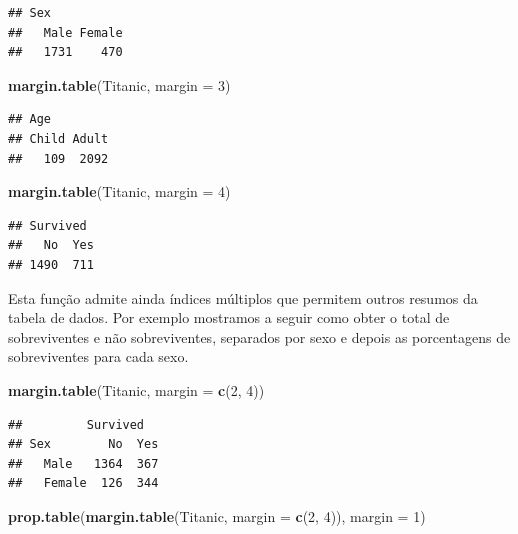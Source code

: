 \documentclass[
]{book}
\newenvironment{Shaded}{\begin{snugshade}}{\end{snugshade}}
\newcommand{\DataTypeTok}[1]{\textcolor[rgb]{0.13,0.29,0.53}{#1}}
\newcommand{\DecValTok}[1]{\textcolor[rgb]{0.00,0.00,0.81}{#1}}
\newcommand{\KeywordTok}[1]{\textcolor[rgb]{0.13,0.29,0.53}{\textbf{#1}}}
\newcommand{\NormalTok}[1]{#1}
\begin{document}
\begin{verbatim}
## Sex
##   Male Female 
##   1731    470
\end{verbatim}

\begin{Shaded}
\begin{Highlighting}[]
\KeywordTok{margin.table}\NormalTok{(Titanic, }\DataTypeTok{margin =} \DecValTok{3}\NormalTok{)}
\end{Highlighting}
\end{Shaded}

\begin{verbatim}
## Age
## Child Adult 
##   109  2092
\end{verbatim}

\begin{Shaded}
\begin{Highlighting}[]
\KeywordTok{margin.table}\NormalTok{(Titanic, }\DataTypeTok{margin =} \DecValTok{4}\NormalTok{)}
\end{Highlighting}
\end{Shaded}

\begin{verbatim}
## Survived
##   No  Yes 
## 1490  711
\end{verbatim}

Esta função admite ainda índices múltiplos que permitem outros resumos da tabela de dados. Por exemplo mostramos a seguir como obter o total de sobreviventes e não sobreviventes, separados por sexo e depois as porcentagens de sobreviventes para cada sexo.

\begin{Shaded}
\begin{Highlighting}[]
\KeywordTok{margin.table}\NormalTok{(Titanic, }\DataTypeTok{margin =} \KeywordTok{c}\NormalTok{(}\DecValTok{2}\NormalTok{, }\DecValTok{4}\NormalTok{))}
\end{Highlighting}
\end{Shaded}

\begin{verbatim}
##         Survived
## Sex        No  Yes
##   Male   1364  367
##   Female  126  344
\end{verbatim}

\begin{Shaded}
\begin{Highlighting}[]
\KeywordTok{prop.table}\NormalTok{(}\KeywordTok{margin.table}\NormalTok{(Titanic, }\DataTypeTok{margin =} \KeywordTok{c}\NormalTok{(}\DecValTok{2}\NormalTok{, }\DecValTok{4}\NormalTok{)), }\DataTypeTok{margin =} \DecValTok{1}\NormalTok{)}
\end{Highlighting}
\end{Shaded}
\end{document}
